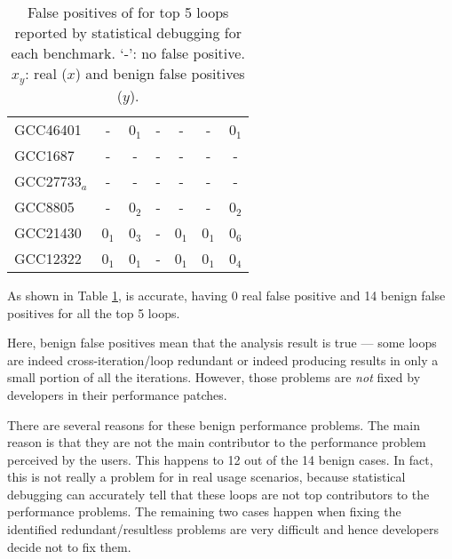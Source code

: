 \begin{table}
\begin{tabular}{lcccccc}
   \midrule
   GCC46401              &   -                  & 0$_1$                       & -                       & -                     &   -             & 0$_1$\\
   GCC1687               &   -                  & -                           & -                       & -                     &   -             & -\\
   GCC27733$_a$          &   -                  & -                           & -                       & -                     &   -             & - \\
   GCC8805               &   -                  & 0$_2$                       & -                       & -                     &   -             & 0$_2$\\
   GCC21430              &   0$_1$              & 0$_3$                       & -                       & 0$_1$                 &   0$_1$         & 0$_6$\\
   GCC12322              &   0$_1$              & 0$_1$                       & -                       & 0$_1$                 &   0$_1$         & 0$_4$\\
\bottomrule
   \end{tabular}
  \caption{False positives of \Tool for top 5 loops reported by 
    statistical debugging for each benchmark. `-': no false positive. $x_y$: real ($x$) and benign false positives ($y$).
}
  \label{tab:top5}
\end{table}

As shown in Table \ref{tab:top5}, \Tool is accurate, having 0 real
false positive and 14 benign false positives for all the top 5 loops.

Here, benign false positives mean that the \Tool analysis result is true ---
some loops are indeed cross-iteration/loop redundant or indeed producing
results in only a small portion of all the iterations. However, those
problems are \textit{not} fixed by developers in their performance patches. 

There are several reasons for these benign performance problems. 
The main reason is that they are not the main contributor to the 
performance problem perceived by the users. This happens to 12 out of the
14 benign cases. In fact, this is not really a problem for \Tool in 
real usage scenarios, because statistical debugging can accurately
tell that these loops are not top contributors to the performance
problems.
The remaining two cases happen when fixing the 
identified redundant/resultless problems
are very difficult and hence developers decide not to fix them.

